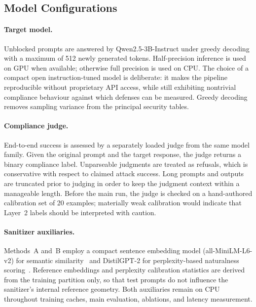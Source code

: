 \documentclass{article}
\begin{document}
\subsection{Model Configurations}
\label{sec:models-setup}

\paragraph{Target model.}
Unblocked prompts are answered by Qwen2.5-3B-Instruct under greedy decoding with a maximum of 512 newly generated tokens.
Half-precision inference is used on GPU when available; otherwise full precision is used on CPU.
The choice of a compact open instruction-tuned model is deliberate: it makes the pipeline reproducible without proprietary API access, while still exhibiting nontrivial compliance behaviour against which defenses can be measured.
Greedy decoding removes sampling variance from the principal security tables.

\paragraph{Compliance judge.}
End-to-end success is assessed by a separately loaded judge from the same model family.
Given the original prompt and the target response, the judge returns a binary compliance label.
Unparseable judgments are treated as refusals, which is conservative with respect to claimed attack success.
Long prompts and outputs are truncated prior to judging in order to keep the judgment context within a manageable length.
Before the main run, the judge is checked on a hand-authored calibration set of 20 examples; materially weak calibration would indicate that Layer~2 labels should be interpreted with caution.

\paragraph{Sanitizer auxiliaries.}
Methods~A and~B employ a compact sentence embedding model (all-MiniLM-L6-v2) for semantic similarity~\cite{reimers2019sentence,wang2020minilm} and DistilGPT-2 for perplexity-based naturalness scoring~\cite{radford2019language}.
Reference embeddings and perplexity calibration statistics are derived from the training partition only, so that test prompts do not influence the sanitizer's internal reference geometry.
Both auxiliaries remain on CPU throughout training caches, main evaluation, ablations, and latency measurement.
\end{document}
